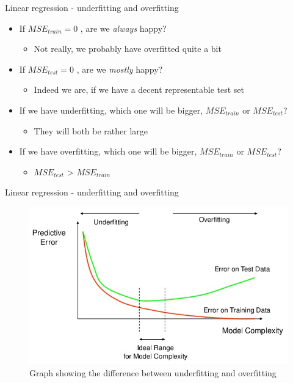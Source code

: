 \documentclass[aspectratio=169]{beamer}
\begin{document}
\begin{frame}{Linear regression - underfitting and overfitting}
    \begin{itemize}[<+->]
        \item If $MSE_{train} = 0$ , are we \textit{always} happy?
            \begin{itemize}
                \item Not really, we probably have overfitted quite a bit
            \end{itemize}
        \item If $MSE_{test} = 0$ , are we \textit{mostly} happy?
            \begin{itemize}
                \item Indeed we are, if we have a decent representable test set
            \end{itemize}
        \item If we have underfitting, which one will be bigger, $MSE_{train}$ or $MSE_{test}$?
            \begin{itemize}
                \item They will both be rather large
            \end{itemize}
        \item If we have overfitting, which one will be bigger, $MSE_{train}$ or $MSE_{test}$?
            \begin{itemize}
                \item $MSE_{test}$ > $MSE_{train}$
            \end{itemize}
    \end{itemize}
\end{frame}
\begin{frame}{Linear regression - underfitting and overfitting}
    \begin{center}
        \begin{figure}
            \includegraphics[scale=0.46]{./images/underoverfitGraph.jpg}
            \caption{Graph showing the difference between underfitting and overfitting}
        \end{figure}
    \end{center}
\end{frame}
\end{document}
